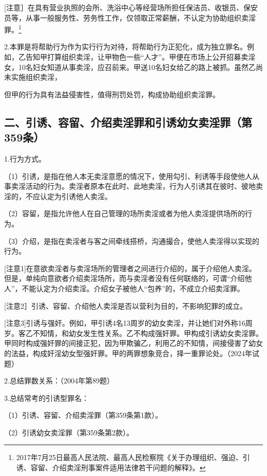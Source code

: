 [注意］在具有营业执照的会所、洗浴中心等经营场所担任保洁员、收银员、保安员等，从事一般服务性、劳务性工作，仅领取正常薪酬，不认定为协助组织卖淫罪。\footnote{2017年7月25日最高人民法院、最高人民检察院《关于办理组织、强迫、引诱、容留、介绍卖淫刑事案件适用法律若干问题的解释》。}

2.本罪是将帮助行为作为实行行为对待，将帮助行为正犯化，成为独立罪名。例如，乙告知甲打算组织卖淫，让甲物色一些“人才”。甲便在市场上公开招募卖淫女，10名妇女知道从事卖淫，应召前来。甲送10名妇女给乙的路上被抓。虽然乙尚未实施组织卖淫，

但甲的行为具有法益侵害性，值得刑罚处罚，构成协助组织卖淫罪。

\subsection*{二、引诱、容留、介绍卖淫罪和引诱幼女卖淫罪（第359条）}

1.行为方式。

（1）引诱，是指在他人本无卖淫意愿的情况下，使用勾引、利诱等手段使他人从事卖淫活动的行为。卖淫者原本在此时、此地卖淫，行为人引诱其在彼时、彼地卖淫的，不应认定为引诱他人卖淫。

（2）容留，是指允许他人在自己管理的场所卖淫或者为他人卖淫提供场所的行为。

（3）介绍，是指在卖淫者与客之间牵线搭桥，沟通撮合，使他人卖淫得以实现的行为。

[注意1]在意欲卖淫者与卖淫场所的管理者之间进行介绍的，属于介绍他人卖淫。但是，单纯向意欲者介绍卖淫场所，而与卖淫者没有任何联络的，可谓“介绍他人”，不能认定为介绍卖淫。介绍女子被他人“包养”的，不成立介绍卖淫罪。

[注意2］引诱、容留、介绍他人卖淫是否以营利为目的，不影响犯罪的成立。

[注意3]引诱与强奸。例如，甲引诱4名13周岁的幼女卖淫，并让她们对外称16周岁。客乙不知情，和幼女发生性关系。乙不构成强奸罪。甲构成引诱幼女卖淫罪。甲同时构成强奸罪的间接正犯，因为甲欺骗乙，利用乙的不知情，间接侵害了幼女的法益，构成奸淫幼女型强奸罪。甲的两罪想象竞合，择一重罪论处。（2024年试题）

2.总结罪数关系：（2004年第89题）


3.总结常考的引诱型罪名：

（1）引诱、容留、介绍卖淫罪（第359条第1款）。

（2）引诱幼女卖淫罪（第359条第2款）。

